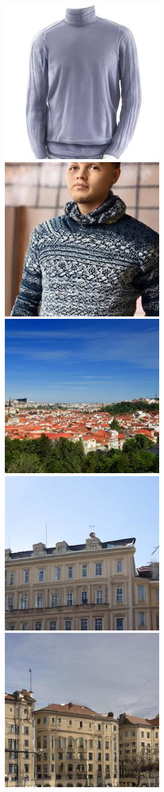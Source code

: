 \begin{figure}[h!]
\begin{subfigure}[t]{0.32\linewidth}
	\includegraphics[width=0.320\linewidth]{figs/samples_appendix_3/base_cfg_2_ode_prompt_28_image_2.jpg}\;%
	\includegraphics[width=0.320\linewidth]{figs/samples_appendix_3/base_cfg_2_ode_prompt_28_image_3.jpg}\\ 
	\includegraphics[width=0.320\linewidth]{figs/samples_appendix_3/base_cfg_2_ode_prompt_34_image_1.jpg}\;%
	\includegraphics[width=0.320\linewidth]{figs/samples_appendix_3/base_cfg_2_ode_prompt_34_image_2.jpg}\;%
	\includegraphics[width=0.320\linewidth]{figs/samples_appendix_3/base_cfg_2_ode_prompt_34_image_3.jpg}\\ 

\end{subfigure}
\end{figure}
